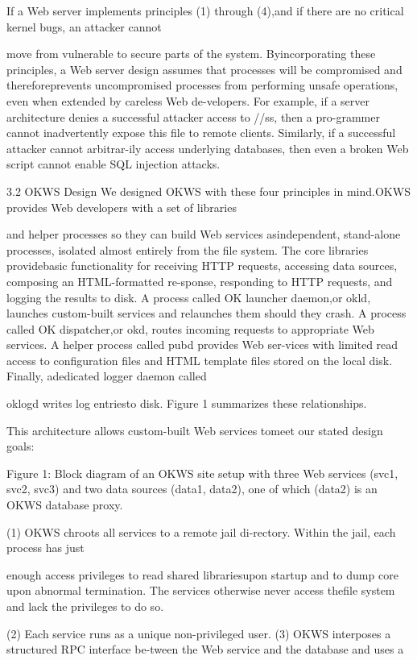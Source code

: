 If a Web server implements principles (1) through (4),and if there are no critical kernel bugs, an attacker cannot

move from vulnerable to secure parts of the system. Byincorporating these principles, a Web server design assumes that processes will be compromised and thereforeprevents uncompromised processes from performing unsafe operations, even when extended by careless Web de-velopers. For example, if a server architecture denies a
successful attacker access to /\Gamma \Delta \Pi /\Sigma \Upsilon ss\Phi \Xi , then a pro-grammer cannot inadvertently expose this file to remote
clients. Similarly, if a successful attacker cannot arbitrar-ily access underlying databases, then even a broken Web
script cannot enable SQL injection attacks.

3.2 OKWS Design
We designed OKWS with these four principles in mind.OKWS provides Web developers with a set of libraries

and helper processes so they can build Web services asindependent, stand-alone processes, isolated almost entirely from the file system. The core libraries providebasic functionality for receiving HTTP requests, accessing data sources, composing an HTML-formatted re-sponse, responding to HTTP requests, and logging the
results to disk. A process called OK launcher daemon,or okld, launches custom-built services and relaunches
them should they crash. A process called OK dispatcher,or okd, routes incoming requests to appropriate Web services. A helper process called pubd provides Web ser-vices with limited read access to configuration files and
HTML template files stored on the local disk. Finally, adedicated logger daemon called

oklogd writes log entriesto disk. Figure 1 summarizes these relationships.

This architecture allows custom-built Web services tomeet our stated design goals:

Figure 1: Block diagram of an OKWS site setup with three Web
services (svc1, svc2, svc3) and two data sources (data1, data2),
one of which (data2) is an OKWS database proxy.

(1) OKWS chroots all services to a remote jail di-rectory. Within the jail, each process has just

enough access privileges to read shared librariesupon startup and to dump core upon abnormal termination. The services otherwise never access thefile system and lack the privileges to do so.

(2) Each service runs as a unique non-privileged user.
(3) OKWS interposes a structured RPC interface be-tween the Web service and the database and uses a

